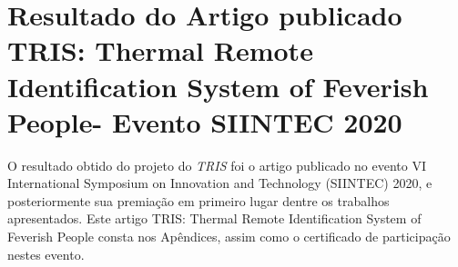 \section{Resultado do Artigo publicado TRIS: Thermal Remote Identification System of Feverish People- Evento SIINTEC 2020 }
\label{sec:siintec}
O resultado obtido do projeto do \textit{TRIS} foi o artigo publicado no evento VI International Symposium on Innovation and Technology (SIINTEC) 2020, e posteriormente sua premiação em primeiro lugar dentre os trabalhos apresentados. Este artigo TRIS: Thermal Remote Identification System of Feverish People consta nos Apêndices, assim como o certificado de participação nestes evento.